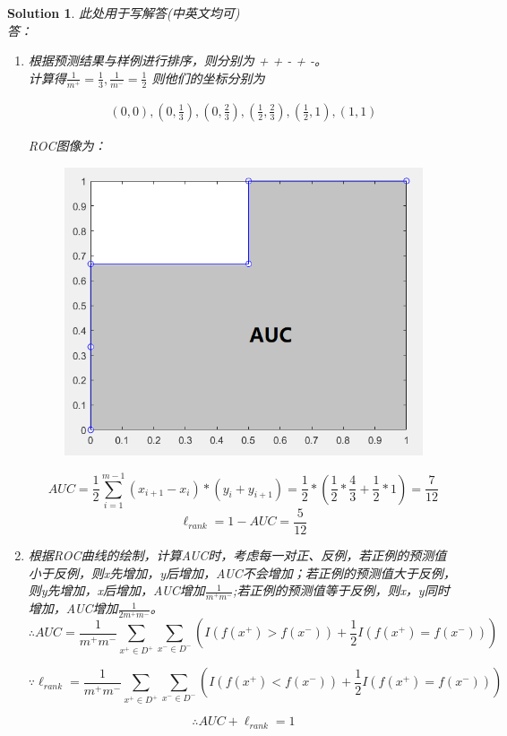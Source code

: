 \documentclass[a4paper,UTF8]{article}
\numberwithin{equation}{section}
\newtheorem*{mySol}{Solution}
\begin{document}
\begin{mySol}
此处用于写解答(中英文均可)
~\\
答：\\

\begin{enumerate}[ {(}1{)}]
\item 
	根据预测结果与样例进行排序，则分别为 + + - + -。\\
	计算得$\frac{1}{m^+}=\frac{1}{3},\frac{1}{m^-}=\frac{1}{2}$
	则他们的坐标分别为
	
	\begin{eqnarray*}
	(0,0),
	(0,\frac{1}{3}),
	(0,\frac{2}{3}),
	(\frac{1}{2},\frac{2}{3}),
	(\frac{1}{2},1),
	(1,1)
	\end{eqnarray*}
	
	ROC图像为：\\
	
	\begin{figure}[H]
	\begin{center}
		\includegraphics[width=0.32\linewidth]{roc.png}
	\end{center}
	\vspace{-0.5em}
	\end{figure}
	
	\[
		AUC=\frac{1}{2}\sum^{m-1}_{i=1}{(x_{i+1}-x_i)*(y_i+y_{i+1})}
		=\frac{1}{2}*(\frac{1}{2}*\frac{4}{3}+\frac{1}{2}*1)
		=\frac{7}{12}		
	\] 
	\[\ell_{rank}=1-AUC=\frac{5}{12}\]
	
\item
	根据ROC曲线的绘制，计算AUC时，考虑每一对正、反例，若正例的预测值小于反例，则x先增加，y后增加，AUC不会增加；若正例的预测值大于反例，则y先增加，x后增加，AUC增加$\frac{1}{m^+m^-}$;若正例的预测值等于反例，则x，y同时增加，AUC增加$\frac{1}{2m^+m^-}$。\\
	
	\[
	\therefore AUC=\frac{1}{m^+m^-}\sum_{x^+ \in D^+}\sum_{x^- \in D^-}(I(f(x^+)>f(x^-))+\frac{1}{2}I(f(x^+)=f(x^-)))
	\]
	
	\[
	\because \ell_{rank}=\frac{1}{m^+m^-}\sum_{x^+ \in D^+}\sum_{x^- \in D^-}(I(f(x^+)<f(x^-))+\frac{1}{2}I(f(x^+)=f(x^-)))
	\]
	
	\[\therefore AUC+\ell_{rank}=1 \]
	
\end{enumerate}

\end{mySol}
\end{document}
